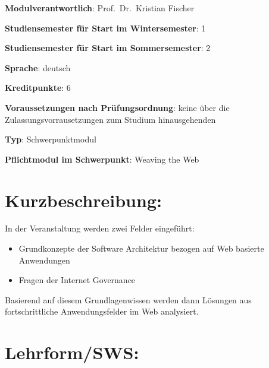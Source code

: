 \begin{modulHead}
\textbf{Modulverantwortlich}: Prof.~Dr.~Kristian
Fischer
\end{modulHead}
\begin{modulHead}
\textbf{Studiensemester für
Start im Wintersemester}:
1
\end{modulHead}
\begin{modulHead}
\textbf{Studiensemester für Start
im Sommersemester}:
2
\end{modulHead}
\begin{modulHead}
\textbf{Sprache}:
deutsch
\end{modulHead}
\begin{modulHead}
\textbf{Kreditpunkte}:
6
\end{modulHead}
\begin{modulHead}
\textbf{Voraussetzungen nach
Prüfungsordnung}: keine über die Zulassungsvorrausetzungen zum Studium
hinausgehenden
\end{modulHead}
\begin{modulHead}
\textbf{Typ}:
Schwerpunktmodul
\end{modulHead}
\begin{modulHead}
\textbf{Pflichtmodul
im Schwerpunkt}: Weaving the Web
\end{modulHead}


\section*{Kurzbeschreibung:\label{/mi-2017/modulbeschreibungen-master/MA_WTW_Modul_Web-Architekturen}}\label{kurzbeschreibungpathlabelmi-2017modulbeschreibungen-mastermaux5fwtwux5fmodulux5fweb-architekturen}

In der Veranstaltung werden zwei Felder eingeführt:

\begin{itemize}
\tightlist
\item
  Grundkonzepte der Software Architektur bezogen auf Web basierte
  Anwendungen
\item
  Fragen der Internet Governance
\end{itemize}

Basierend auf diesem Grundlagenwissen werden dann Lösungen aus
fortschrittliche Anwendungsfelder im Web analysiert.

\section*{Lehrform/SWS:\label{/mi-2017/modulbeschreibungen-master/MA_WTW_Modul_Web-Architekturen}}\label{lehrformswspathlabelmi-2017modulbeschreibungen-mastermaux5fwtwux5fmodulux5fweb-architekturen}

